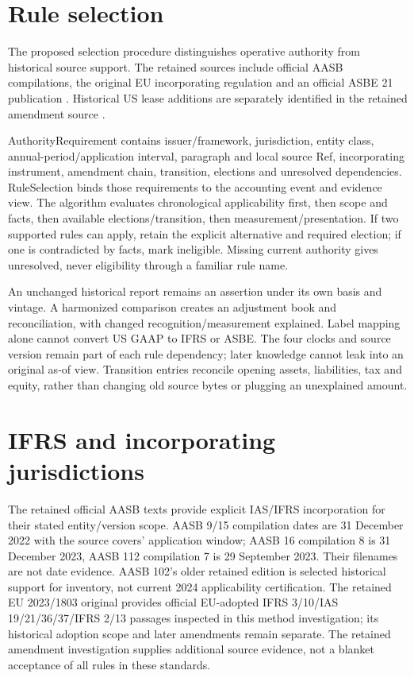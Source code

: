 \hypertarget{rule-selection}{%
\section{Rule selection}\label{method-standards-methods-rule-selection}}

The proposed selection procedure distinguishes operative authority from historical source support. The retained sources include official AASB compilations, the original EU incorporating regulation and an official ASBE 21 publication \citep{aasb9dated,aasb15dated,aasb16dated,aasb112dated,eu20231803,mofasbe21}. Historical US lease additions are separately identified in the retained amendment source \citep{fasbasu201602}.

AuthorityRequirement contains issuer/framework, jurisdiction, entity class, annual-period/application interval, paragraph and local source Ref, incorporating instrument, amendment chain, transition, elections and unresolved dependencies. RuleSelection binds those requirements to the accounting event and evidence view. The algorithm evaluates chronological applicability first, then scope and facts, then available elections/transition, then measurement/presentation. If two supported rules can apply, retain the explicit alternative and required election; if one is contradicted by facts, mark ineligible. Missing current authority gives unresolved, never eligibility through a familiar rule name.

An unchanged historical report remains an assertion under its own basis and vintage. A harmonized comparison creates an adjustment book and reconciliation, with changed recognition/measurement explained. Label mapping alone cannot convert US GAAP to IFRS or ASBE. The four clocks and source version remain part of each rule dependency; later knowledge cannot leak into an original as-of view. Transition entries reconcile opening assets, liabilities, tax and equity, rather than changing old source bytes or plugging an unexplained amount.

\hypertarget{ifrs-and-incorporating-jurisdictions}{%
\section{IFRS and incorporating jurisdictions}\label{method-standards-methods-ifrs-and-incorporating-jurisdictions}}

The retained official AASB texts provide explicit IAS/IFRS incorporation for their stated entity/version scope. AASB 9/15 compilation dates are 31 December 2022 with the source covers' application window; AASB 16 compilation 8 is 31 December 2023, AASB 112 compilation 7 is 29 September 2023. Their filenames are not date evidence. AASB 102's older retained edition is selected historical support for inventory, not current 2024 applicability certification. The retained EU 2023/1803 original provides official EU-adopted IFRS 3/10/IAS 19/21/36/37/IFRS 2/13 passages inspected in this method investigation; its historical adoption scope and later amendments remain separate. The retained amendment investigation supplies additional source evidence, not a blanket acceptance of all rules in these standards.

